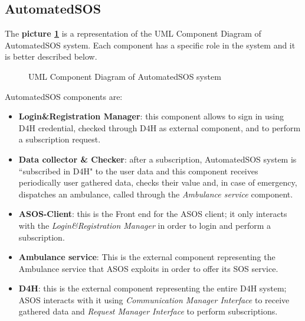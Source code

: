 \subsection{AutomatedSOS}

The \textbf{picture \ref{fig:ASOS-component}} is a representation of the UML Component Diagram of AutomatedSOS system. Each component has a specific role in the system and it is better described below. 

\begin{figure}[H]
    \centering
    \caption{UML Component Diagram of AutomatedSOS system}
    \label{fig:ASOS-component}
\end{figure}

AutomatedSOS components are:
\begin{itemize}
    \item \textbf{Login\&Registration Manager}: this component allows to sign in using D4H credential, checked through D4H as external component, and to perform a subscription request.
    \item \textbf{Data collector \& Checker}: after a subscription, AutomatedSOS system is ``subscribed in D4H" to the user data and this component receives periodically user gathered data, checks their value and, in case of emergency, dispatches an ambulance, called through the \emph{Ambulance service} component.
    \item \textbf{ASOS-Client}: this is the Front end for the ASOS client; it only interacts with the \emph{Login\&Registration Manager} in order to login and perform a subscription.
    \item \textbf{Ambulance service}: This is the external component representing the Ambulance service that ASOS exploits in order to offer its SOS service.
    \item \textbf{D4H}: this is the external component representing the entire D4H system; ASOS interacts with it using \emph{Communication Manager Interface} to receive gathered data and \emph{Request Manager Interface} to perform subscriptions.
\end{itemize}

